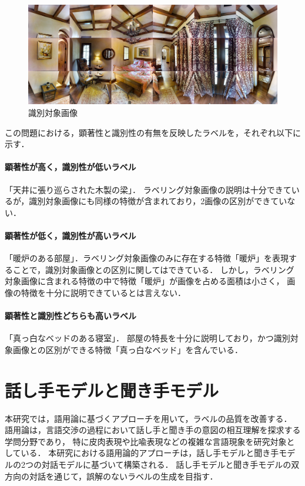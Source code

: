 \documentclass[a4paper,11pt]{jreport}
\begin{document}
\begin{figure}[H]
	\centering
	\includegraphics[width=0.8\linewidth]{figures/3-2_pink_bed.jpg}
	\caption{識別対象画像}
	\label{fig:pink_bed}
\end{figure}

この問題における，顕著性と識別性の有無を反映したラベルを，それぞれ以下に示す．

\paragraph*{顕著性が高く，識別性が低いラベル}
「天井に張り巡らされた木製の梁」．
ラベリング対象画像の説明は十分できているが，識別対象画像にも同様の特徴が含まれており，2画像の区別ができていない．
\paragraph*{顕著性が低く，識別性が高いラベル}
「暖炉のある部屋」．ラベリング対象画像のみに存在する特徴「暖炉」を表現することで，識別対象画像との区別に関してはできている．
しかし，ラベリング対象画像に含まれる特徴の中で特徴「暖炉」が画像を占める面積は小さく，
画像の特徴を十分に説明できているとは言えない．
\paragraph*{顕著性と識別性どちらも高いラベル}
「真っ白なベッドのある寝室」．
部屋の特長を十分に説明しており，かつ識別対象画像との区別ができる特徴「真っ白なベッド」を含んでいる．

\section{話し手モデルと聞き手モデル}

本研究では，語用論に基づくアプローチを用いて，ラベルの品質を改善する．
語用論は，言語交渉の過程において話し手と聞き手の意図の相互理解を探求する学問分野であり，
特に皮肉表現や比喩表現などの複雑な言語現象を研究対象としている．
本研究における語用論的アプローチは，話し手モデルと聞き手モデルの2つの対話モデルに基づいて構築される．
話し手モデルと聞き手モデルの双方向の対話を通じて，誤解のないラベルの生成を目指す．
\end{document}
